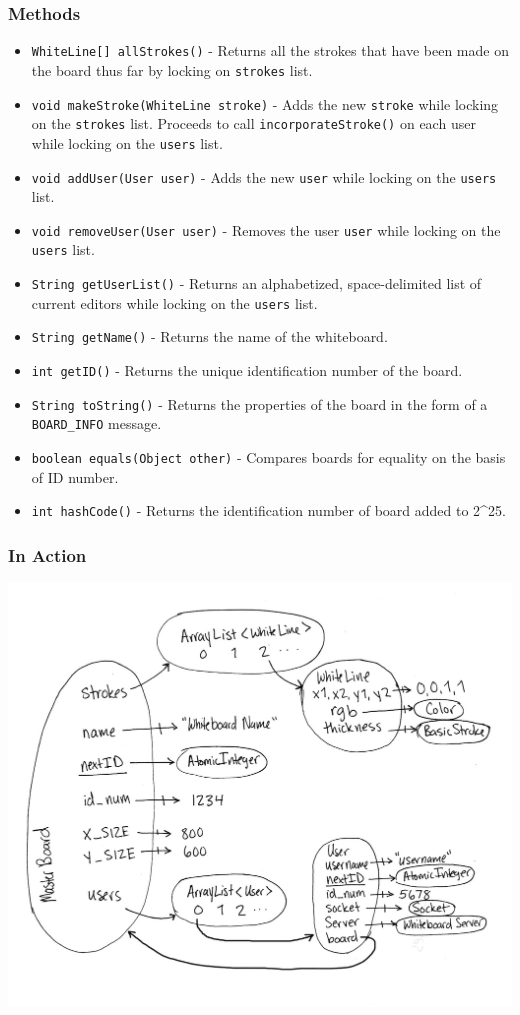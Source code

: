 \subsubsection{Methods}
\begin{itemize}
\item \texttt{WhiteLine[] allStrokes()} - Returns all the strokes that have been made on the board thus far by locking on \texttt{strokes} list.
\item \texttt{void makeStroke(WhiteLine stroke)} - Adds the new \texttt{stroke} while locking on the \texttt{strokes} list. Proceeds to call \texttt{incorporateStroke()} on each user while locking on the \texttt{users} list.
\item \texttt{void addUser(User user)} - Adds the new \texttt{user} while locking on the \texttt{users} list.
\item \texttt{void removeUser(User user)} - Removes the user \texttt{user} while locking on the \texttt{users} list.
\item \texttt{String getUserList()} - Returns an alphabetized, space-delimited list of current editors while locking on the \texttt{users} list.
\item \texttt{String getName()} - Returns the name of the whiteboard.
\item \texttt{int getID()} - Returns the unique identification number of the board.
\item \texttt{String toString()} - Returns the properties of the board in the form of a \texttt{BOARD\_INFO} message.
\item \texttt{boolean equals(Object other)} - Compares boards for equality on the basis of ID number.
\item \texttt{int hashCode()} - Returns the identification number of board added to 2^{25}.
\end{itemize}

\subsubsection{In Action}
\includegraphics[keepaspectratio=1,width=6in]{img/wb-snapshot.jpg}


